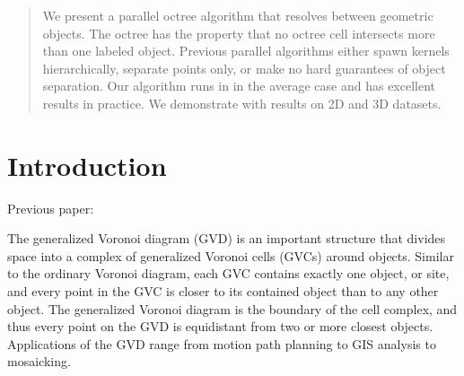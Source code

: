 \documentclass{egpubl}
\begin{document}
\begin{abstract}
We present a parallel octree algorithm that resolves between geometric objects. The octree has the property that no octree cell intersects more than one labeled object. Previous parallel algorithms either spawn kernels hierarchically, separate points only, or make no hard guarantees of object separation. Our algorithm runs in  in the average case and has excellent results in practice. We demonstrate with results on 2D and 3D datasets.


\begin{classification} %
\end{classification}

\end{abstract}


\section{Introduction}
\label{sec:intro}
Previous paper: \cite{edwards2015approximating}

The generalized Voronoi diagram (GVD) is an important structure that divides space into a complex of generalized Voronoi cells (GVCs) around objects.  Similar to the ordinary Voronoi diagram, each GVC contains exactly one object, or site, and every point in the GVC is closer to its contained object than to any other object.  The generalized Voronoi diagram is the boundary of the cell complex, and thus every point on the GVD is equidistant from two or more closest objects.  Applications of the GVD range from motion path planning to GIS analysis to mosaicking.
\end{document}
